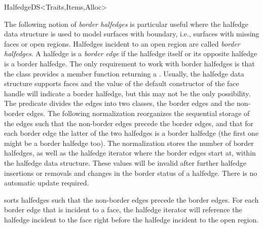 \begin{ccRefConcept}{HalfedgeDS<Traits,Items,Alloc>}
\ccMethod{void faces_erase( Face_handle first, Face_handle last);}{
    removes the range of faces $[\ccc{first},\ccc{last})$ if faces are 
    supported and \ccc{Supports_removal} $\equiv$ \ccc{CGAL::Tag_true}.}

\ccGlue
{}
\ccGlue
{}



\begin{ccAdvanced}
\vspace*{-2mm}
  
The following notion of {\em border halfedges\/} is particular useful
where the halfedge data structure is used to model surfaces with
boundary, i.e., surfaces with missing faces or open regions. Halfedges
incident to an open region are called {\em border halfedges}. A
halfedge is a {\em border edge\/} if the halfedge itself or its
opposite halfedge is a border halfedge. The only requirement to work
with border halfedges is that the
 class provides a member function 
returning a . Usually, the halfedge data structure
supports faces and the value of the default constructor of the face
handle will indicate a border halfedge, but this may not be the only
possibility. The  predicate divides the edges into
two classes, the border edges and the non-border edges. The
following normalization reorganizes the sequential storage of the
edges such that the non-border edges precede the border edges, and
that for each border edge the latter of the two halfedges is a
border halfedge (the first one might be a border halfedge too). The
normalization stores the number of border halfedges, as well as the
halfedge iterator where the border edges start at, within the
halfedge data structure.  These values will be invalid after further
halfedge insertions or removals and changes in the border status of 
a halfedge. There is no automatic update required.


    {sorts halfedges such that the non-border edges precede the
     border edges. For each border edge that is incident to a face,
     the halfedge iterator will reference the halfedge incident to the
     face right before the halfedge incident to the open region.}


\end{ccAdvanced}
\end{ccRefConcept}

